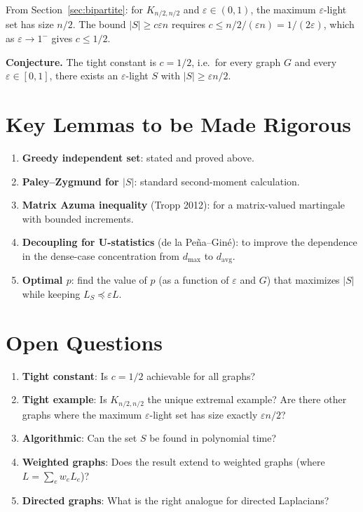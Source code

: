 \documentclass[12pt]{article}
\theoremstyle{definition}
\theoremstyle{remark}
\begin{document}
From Section~\ref{sec:bipartite}: for $K_{n/2,n/2}$ and $\varepsilon \in (0,1)$, the maximum $\varepsilon$-light set has size $n/2$.  The bound $|S| \ge c\varepsilon n$ requires $c \le n/2 / (\varepsilon n) = 1/(2\varepsilon)$, which as $\varepsilon \to 1^-$ gives $c \le 1/2$.

\textbf{Conjecture.} The tight constant is $c = 1/2$, i.e.\ for every graph $G$ and every $\varepsilon \in [0,1]$, there exists an $\varepsilon$-light $S$ with $|S| \ge \varepsilon n/2$.

\section{Key Lemmas to be Made Rigorous}

\begin{enumerate}
  \item \textbf{Greedy independent set}: stated and proved above.
  \item \textbf{Paley--Zygmund for $|S|$}: standard second-moment calculation.
  \item \textbf{Matrix Azuma inequality} (Tropp 2012): for a matrix-valued martingale with bounded increments.
  \item \textbf{Decoupling for U-statistics} (de la Pe\~{n}a--Gin\'{e}): to improve the dependence in the dense-case concentration from $d_{\max}$ to $d_{\mathrm{avg}}$.
  \item \textbf{Optimal $p$}: find the value of $p$ (as a function of $\varepsilon$ and $G$) that maximizes $|S|$ while keeping $L_S \preceq \varepsilon L$.
\end{enumerate}

\section{Open Questions}

\begin{enumerate}
  \item \textbf{Tight constant}: Is $c = 1/2$ achievable for all graphs?
  \item \textbf{Tight example}: Is $K_{n/2,n/2}$ the unique extremal example?  Are there other graphs where the maximum $\varepsilon$-light set has size exactly $\varepsilon n/2$?
  \item \textbf{Algorithmic}: Can the set $S$ be found in polynomial time?
  \item \textbf{Weighted graphs}: Does the result extend to weighted graphs (where $L = \sum_{e} w_e L_e$)?
  \item \textbf{Directed graphs}: What is the right analogue for directed Laplacians?
\end{enumerate}
\end{document}
